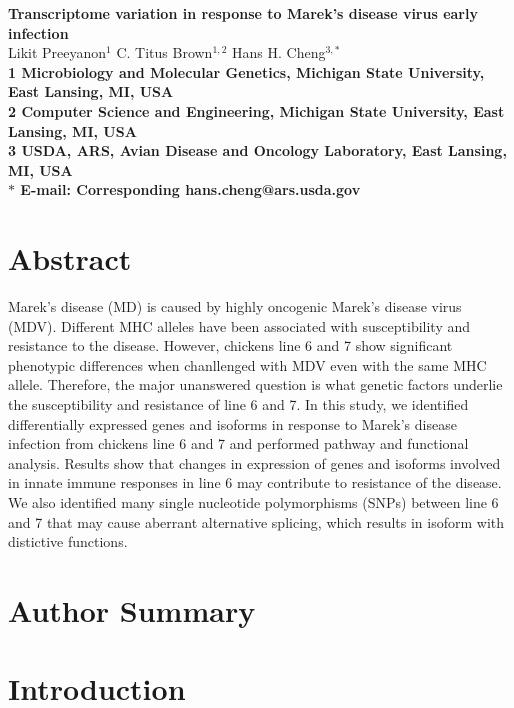 \documentclass[10pt]{article}
\date{}
\begin{document}
\begin{flushleft}
{\Large
\textbf{Transcriptome variation in response to Marek's disease virus early infection}
}
\\
Likit Preeyanon$^{1}$
C. Titus Brown$^{1,2}$
Hans H. Cheng$^{3,\ast}$
\\
\bf{1} Microbiology and Molecular Genetics, Michigan State University, East Lansing, MI, USA
\\
\bf{2} Computer Science and Engineering, Michigan State University, East Lansing, MI, USA
\\
\bf{3} USDA, ARS, Avian Disease and Oncology Laboratory, East Lansing, MI, USA
\\
$\ast$ E-mail: Corresponding hans.cheng@ars.usda.gov
\end{flushleft}

\section*{Abstract}
Marek's disease (MD) is caused by highly oncogenic Marek's disease virus (MDV).
Different MHC alleles have been associated with susceptibility and resistance to the disease.
However, chickens line 6 and 7 show significant phenotypic differences when chanllenged with
MDV even with the same MHC allele. Therefore, the major unanswered question is what genetic factors
underlie the susceptibility and resistance of line 6 and 7.
In this study, we identified differentially expressed genes and isoforms in response to Marek's disease infection
from chickens line 6 and 7 and performed pathway and functional analysis.
Results show that changes in expression of genes and isoforms involved in innate immune responses in line 6 may contribute
to resistance of the disease. We also identified many single nucleotide polymorphisms (SNPs) between
line 6 and 7 that may cause aberrant alternative splicing, which results in isoform with distictive functions.

\section*{Author Summary}

\section*{Introduction}
\end{document}
